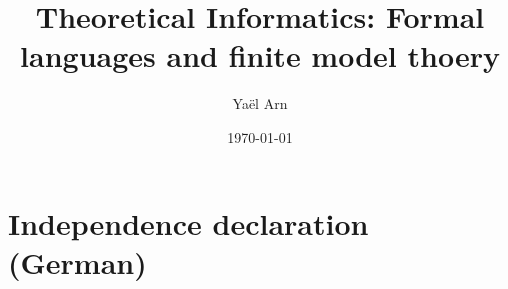 \documentclass[a4paper,11pt]{report}
\title %
{Theoretical Informatics: Formal languages and finite model thoery}
\date{\today}   %
\author{Yaël Arn}  %
\begin{document}


\tableofcontents %
\newpage %


\onehalfspacing %
\renewcommand{\chaptermark}[1]{\markboth{\MakeUppercase{\thechapter.\ #1}}{}} %
\renewcommand{\sectionmark}[1]{\markright{\thesection.\ #1}{}} %
\fancyhead[R]{\rightmark}
\fancyhead[L]{\leftmark}
\fancyhead[C]{\thepage{}} %
\fancyhead[L]{\leftmark}
\fancyhead[R]{\rightmark}
\fancyfoot{}
\pagestyle{fancy}










\cleardoublepage  %
\printindex %


\cleardoublepage %
\listoffigures %

\cleardoublepage %
\lstlistoflistings %

\cleardoublepage %
\printbibliography %


\appendix



\chapter*{Independence declaration (German)}\label{ch:appendix_independencedeclaration}



\end{document}
